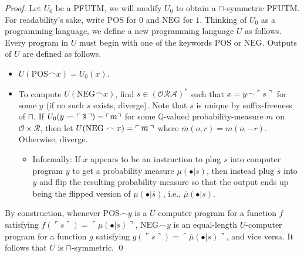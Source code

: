 \documentclass[runningheads]{llncs}
\begin{document}
\begin{proof}
    Let $U_0$ be a PFUTM, we will modify $U_0$ to obtain a $\sqcap$-symmetric PFUTM.
    For readability's sake, write $\mathrm{POS}$ for $0$ and $\mathrm{NEG}$ for $1$.
    Thinking of $U_0$ as a programming language, we define a new programming language
    $U$ as follows. Every program in $U$ must begin with one of the keywords
    $\mathrm{POS}$ or $\mathrm{NEG}$. Outputs of $U$ are defined as follows.
    \begin{itemize}
        \item $U(\mathrm{POS}\frown x)=U_0(x)$.
        \item To compute $U(\mathrm{NEG}\frown x)$, find
        $s\in (\mathcal O \mathcal R\mathcal A)^*$ such that
        $x=y\frown \ulcorner s\urcorner$ for some $y$ (if no such $s$ exists, diverge).
        Note that $s$ is unique by suffix-freeness of $\sqcap$.
        If $
            U_0(y\frown
            \ulcorner \hspace{.2em} \overline s\hspace{.2em}\urcorner)
            =\ulcorner m\urcorner
        $
        for some $\mathbb Q$-valued probability-measure $m$ on
        $\mathcal O\times\mathcal R$, then let
        $U(\mathrm{NEG}\frown x)=\ulcorner\hspace{.2em} \overline m\hspace{.2em}\urcorner$
        where $\overline m(o,r)=m(o,-r)$.
        Otherwise, diverge.
        \begin{itemize}
            \item Informally:
            If $x$ appears to be an instruction to plug $s$ into computer
            program $y$ to get a probability measure $\mu(\bullet|s)$, then
            instead plug $\overline s$ into $y$ and flip the resulting
            probability measure so that the output
            ends up being the flipped version of $\mu(\bullet|\overline s)$,
            i.e., $\overline \mu(\bullet|s)$.
        \end{itemize}
    \end{itemize}
    By construction, whenever $\mathrm{POS}\frown y$ is a $U$-computer program
    for a function $f$ satisfying
    $f(\ulcorner s\urcorner)=\ulcorner \mu(\bullet|s)\urcorner$,
    $\mathrm{NEG}\frown y$ is an equal-length $U$-computer program
    for a function $g$ satisfying
    $g(\ulcorner s\urcorner)=\ulcorner \overline\mu(\bullet|s)\urcorner$,
    and vice versa.
    It follows that $U$ is $\sqcap$-symmetric.
    \qed
\end{proof}
\end{document}
